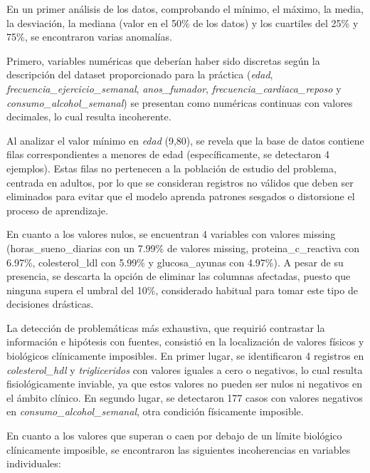 \documentclass[journal,onecolumn]{IEEEtran}
\begin{document}
En un primer análisis de los datos, comprobando el mínimo, el máximo, la media, la desviación, la mediana (valor en el 50\% de los datos) y los cuartiles del 25\% y 75\%, se encontraron varias anomalías.


Primero, variables numéricas que deberían haber sido discretas según la descripción del dataset proporcionado para la práctica (\textit{edad}, \textit{frecuencia\_ejercicio\_semanal}, \textit{anos\_fumador}, \textit{frecuencia\_cardiaca\_reposo} y \textit{consumo\_alcohol\_semanal}) se presentan como numéricas continuas con valores decimales, lo cual resulta incoherente.

Al analizar el valor mínimo en \textit{edad} (9,80), se revela que la base de datos contiene filas correspondientes a menores de edad (específicamente, se detectaron 4 ejemplos). Estas filas no pertenecen a la población de estudio del problema, centrada en adultos, por lo que se consideran registros no válidos que deben ser eliminados para evitar que el modelo aprenda patrones sesgados o distorsione el proceso de aprendizaje.

En cuanto a los valores nulos, se encuentran 4 variables con valores missing (horas\_sueno\_diarias con un 7.99\% de valores missing, proteina\_c\_reactiva con 6.97\%, colesterol\_ldl con 5.99\% y glucosa\_ayunas con 4.97\%). A pesar de su presencia, se descarta la opción de eliminar las columnas afectadas, puesto que ninguna supera el umbral del 10\%, considerado habitual para tomar este tipo de decisiones drásticas.

La detección de problemáticas más exhaustiva, que requirió contrastar la información e hipótesis con fuentes, consistió en la localización de valores físicos y biológicos clínicamente imposibles. En primer lugar, se identificaron 4 registros en \textit{colesterol\_hdl} y \textit{trigliceridos} con valores iguales a cero o negativos, lo cual resulta fisiológicamente inviable, ya que estos valores no pueden ser nulos ni negativos en el ámbito clínico. En segundo lugar, se detectaron 177 casos con valores negativos en \textit{consumo\_alcohol\_semanal}, otra condición físicamente imposible.

En cuanto a los valores que superan o caen por debajo de un límite biológico clínicamente imposible, se encontraron las siguientes incoherencias en variables individuales:
\end{document}
